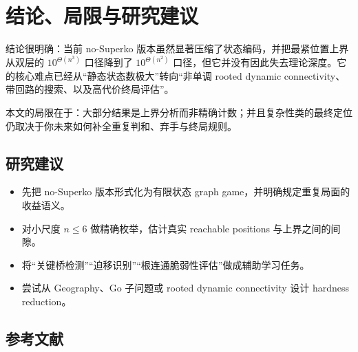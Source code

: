 \documentclass[12pt]{ctexart}
\begin{document}
\section*{结论、局限与研究建议}

结论很明确：当前 no-Superko 版本虽然显著压缩了状态编码，并把最紧位置上界从双层的 \(10^{\Theta(n^3)}\) 口径降到了 \(10^{\Theta(n^2)}\) 口径，但它并没有因此失去理论深度。它的核心难点已经从“静态状态数极大”转向“非单调 rooted dynamic connectivity、带回路的搜索、以及高代价终局评估”。

本文的局限在于：大部分结果是上界分析而非精确计数；并且复杂性类的最终定位仍取决于你未来如何补全重复判和、弃手与终局规则。

\subsection*{研究建议}

\begin{itemize}
\item 先把 no-Superko 版本形式化为有限状态 graph game，并明确规定重复局面的收益语义。
\item 对小尺度 \(n\le 6\) 做精确枚举，估计真实 reachable positions 与上界之间的间隙。
\item 将“关键桥检测”“迫移识别”“根连通脆弱性评估”做成辅助学习任务。
\item 尝试从 Geography、Go 子问题或 rooted dynamic connectivity 设计 hardness reduction。
\end{itemize}

\subsection*{参考文献}
\end{document}
